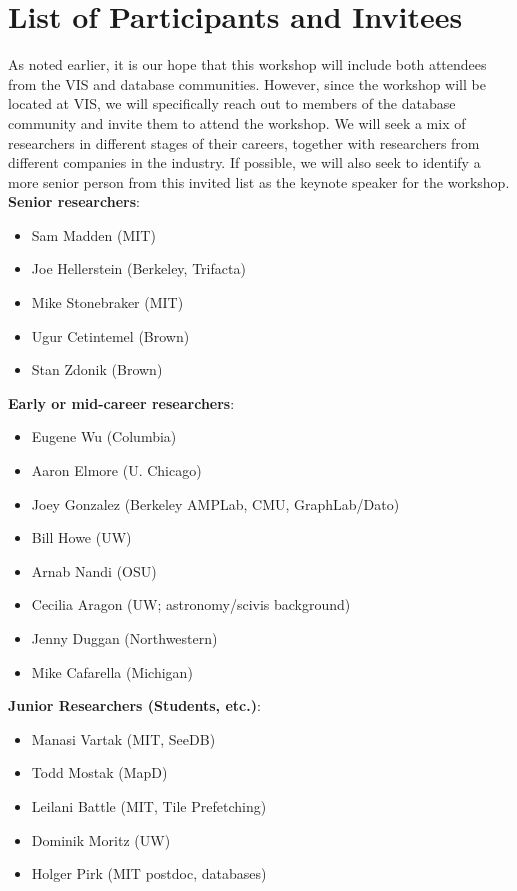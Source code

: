 \documentclass[journal]{vgtc}                %
\begin{document}
\section{List of Participants and Invitees}
\label{sec:invitees}

As noted earlier, it is our hope that this workshop will include both
attendees from the VIS and database communities. However, since the
workshop will be located at VIS, we will specifically reach out to
members of the database community and invite them to attend the
workshop. We will seek a mix of researchers in different stages of
their careers, together with researchers from different companies in
the industry. If possible, we will also seek to identify a more senior
person from this invited list as the keynote speaker for the workshop.\\

\noindent \textbf{Senior researchers}:
\begin{itemize}
\setlength\itemsep{0em}
\item Sam Madden (MIT)
\item Joe Hellerstein (Berkeley, Trifacta)
\item Mike Stonebraker (MIT)
\item Ugur Cetintemel (Brown)
\item Stan Zdonik (Brown)
\end{itemize}

\noindent \textbf{Early or mid-career researchers}:
\begin{itemize}
\setlength\itemsep{0em}
\item Eugene Wu (Columbia)
\item Aaron Elmore (U. Chicago)
\item Joey Gonzalez (Berkeley AMPLab, CMU, GraphLab/Dato)
\item Bill Howe (UW)
\item Arnab Nandi (OSU)
\item Cecilia Aragon (UW; astronomy/scivis background)
\item Jenny Duggan (Northwestern)
\item Mike Cafarella (Michigan)
\end{itemize}

\noindent \textbf{Junior Researchers (Students, etc.)}: 
\begin{itemize}
\setlength\itemsep{0em}
\item Manasi Vartak (MIT, SeeDB)
\item Todd Mostak (MapD)
\item Leilani Battle (MIT, Tile Prefetching)
\item Dominik Moritz (UW)
\item Holger Pirk (MIT postdoc, databases)
\end{itemize}
\end{document}
